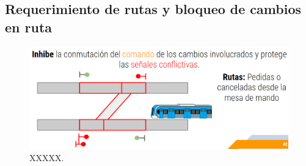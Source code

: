 \subsection{Requerimiento de rutas y bloqueo de cambios en ruta}

\lipsum[1]
    \begin{figure}[!h]
        \centering
        \includegraphics[width=1\textwidth]{Figuras/bloqueo_rutas}
        \centering\caption{XXXXX.}
        \label{fig:ocupacion_1}
    \end{figure}
\lipsum[1]